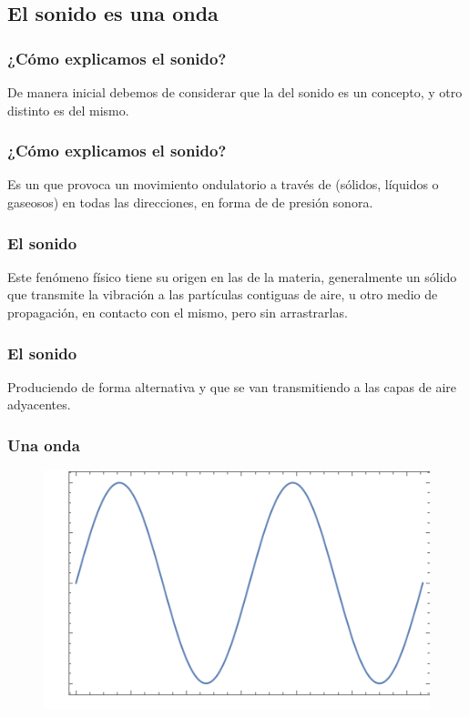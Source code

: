\documentclass[14pt]{beamer}
\begin{document}
\subsection{El sonido es una onda}

\begin{frame}
\frametitle{¿Cómo explicamos el sonido?}
De manera inicial debemos de considerar que la  del sonido es un concepto, \pause y otro distinto es  del mismo.
\end{frame}
\begin{frame}
\frametitle{¿Cómo explicamos el sonido?}
Es un  que provoca un movimiento ondulatorio a través de  (sólidos, líquidos o gaseosos) en todas las direcciones, \pause en forma de  de presión sonora.
\end{frame}
\begin{frame}
\frametitle{El sonido}
Este fenómeno físico tiene su origen en las  de la materia, \pause generalmente un sólido que transmite la vibración a las partículas contiguas de aire, u otro medio de propagación, en contacto con el mismo, pero sin arrastrarlas.
\end{frame}
\begin{frame}
\frametitle{El sonido}
Produciendo de forma alternativa  y  que se van transmitiendo a las capas de aire adyacentes.
\end{frame}
\begin{frame}
\frametitle{Una onda}
\begin{figure}
\centering
\includegraphics[scale=0.7]{Imagenes/Plot_Onda_01.png}
\end{figure}
\end{frame}
\end{document}
